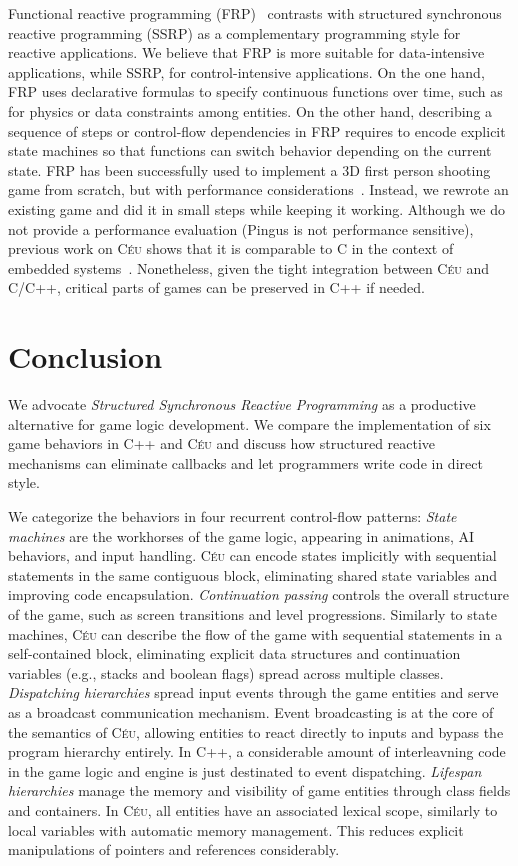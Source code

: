 \documentclass{vgtc}                          %
\newcommand{\CEU}{\textsc{C\'{e}u}\xspace}
\begin{document}
Functional reactive programming (FRP)~\cite{frp.fran} contrasts with
structured synchronous reactive programming (SSRP) as a complementary
programming style for reactive applications.
%
We believe that FRP is more suitable for data-intensive applications, while 
SSRP, for control-intensive applications.
%
On the one hand, FRP uses declarative formulas to specify continuous functions 
over time, such as for physics or data constraints among entities.
%
On the other hand, describing a sequence of steps or control-flow dependencies
in FRP requires to encode explicit state machines so that functions can switch
behavior depending on the current state.
%
FRP has been successfully used to implement a 3D first person shooting game
from scratch, but with performance considerations~\cite{games.frag}.
%
Instead, we rewrote an existing game and did it in small steps while keeping it
working.
Although we do not provide a performance evaluation (Pingus is not performance
sensitive), previous work on \CEU shows that it is comparable to C in the
context of embedded systems~\cite{ceu.sensys13}.
Nonetheless, given the tight integration between \CEU and C/C++, critical parts
of games can be preserved in C++ if needed.

\section{Conclusion}
\label{sec.conclusion}

We advocate \emph{Structured Synchronous Reactive Programming} as a productive
alternative for game logic development.
%
We compare the implementation of six game behaviors in C++ and \CEU and discuss
how structured reactive mechanisms can eliminate callbacks and let programmers
write code in direct style.

We categorize the behaviors in four recurrent control-flow patterns:
%
\emph{State machines} are the workhorses of the game logic, appearing in
animations, AI behaviors, and input handling.
\CEU can encode states implicitly with sequential statements in the same
contiguous block, eliminating shared state variables and improving code
encapsulation.
%
\emph{Continuation passing} controls the overall structure of the game, such as
screen transitions and level progressions.
Similarly to state machines, \CEU can describe the flow of the game with
sequential statements in a self-contained block, eliminating explicit
data structures and continuation variables (e.g., stacks and boolean flags)
spread across multiple classes.
%
\emph{Dispatching hierarchies} spread input events through the game entities
and serve as a broadcast communication mechanism.
Event broadcasting is at the core of the semantics of \CEU, allowing entities
to react directly to inputs and bypass the program hierarchy entirely.
In C++, a considerable amount of interleavning code in the game logic and
engine is just destinated to event dispatching.
%
\emph{Lifespan hierarchies} manage the memory and visibility of game entities
through class fields and containers.
In \CEU, all entities have an associated lexical scope, similarly to local
variables with automatic memory management.
This reduces explicit manipulations of pointers and references considerably.
\end{document}
